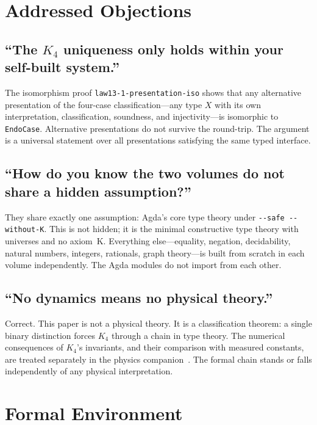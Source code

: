 \documentclass[11pt,a4paper]{article}
\theoremstyle{definition}
\begin{document}
\section{Addressed Objections}
\label{sec:objections}

\subsection*{``The $K_4$ uniqueness only holds within your self-built system.''}

The isomorphism proof \texttt{law13-1-presentation-iso} shows that any
alternative presentation of the four-case classification---any type $X$ with its
own interpretation, classification, soundness, and injectivity---is isomorphic
to \texttt{EndoCase}.  Alternative presentations do not survive the round-trip.
The argument is a universal statement over all presentations satisfying the
same typed interface.

\subsection*{``How do you know the two volumes do not share a hidden assumption?''}

They share exactly one assumption: Agda's core type theory under
\texttt{-{}-safe -{}-without-K}.  This is not hidden; it is the minimal
constructive type theory with universes and no axiom~K.  Everything
else---equality, negation, decidability, natural numbers, integers, rationals,
graph theory---is built from scratch in each volume independently.
The Agda modules do not import from each other.

\subsection*{``No dynamics means no physical theory.''}

Correct.  This paper is not a physical theory.  It is a classification
theorem: a single binary distinction forces $K_4$ through a chain
in type theory.  The numerical consequences of $K_4$'s invariants, and their
comparison with measured constants, are treated separately in the physics
companion~\cite{wielsch2026physics}.  The formal chain stands or falls
independently of any physical interpretation.

\section{Formal Environment}
\label{sec:formal}
\end{document}

